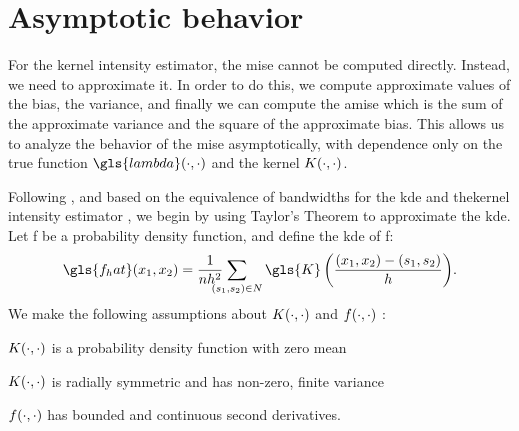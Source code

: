 \section{Asymptotic behavior}
\label{sec:theory:asymptotic_bandwidth}

For the \gls{kernel intensity estimator},
the \gls{mise} cannot be computed directly.
Instead,
we need to approximate it.
In order to do this,
we compute approximate values of the bias,
the variance,
and finally we can compute the \gls{amise} which is the sum of the approximate variance and the square of the approximate bias.
This allows us to analyze the behavior of the \gls{mise} asymptotically,
with dependence only on the true function $\gls{lambda}\dotdot$ and the kernel $K(\cdot, \cdot)$.

Following \citep{silverman1986density,wand1994kernel},
and based on the equivalence of bandwidths for the \gls{kde} and the\gls{kernel intensity estimator} \citep{diggle1988equivalence},
we begin by using Taylor's Theorem to approximate the \gls{kde}.
Let \gls{f} be a probability density function,
and define the \gls{kde} of \gls{f}:
\begin{equation}
    \gls{f_hat} \xvec%
            = \sumSn{\gls{K}\left( \frac{\xvec-(s_1, s_2)}{h} \right)} \text{.}%
\end{equation}
We make the following assumptions about $K(\cdot, \cdot)$
and $f(\cdot, \cdot)$ \citep{silverman1986density,wand1994kernel}:
\begin{assumptions}
    \item $K(\cdot, \cdot)$ is a probability density function with zero mean \label{amise:assumptions:1}
    \item $K(\cdot, \cdot)$ is radially symmetric and has non-zero, finite variance \label{amise:assumptions:2}
    \item $f(\cdot, \cdot)$ has bounded and continuous second derivatives. \label{amise:assumptions:3}
\end{assumptions}

